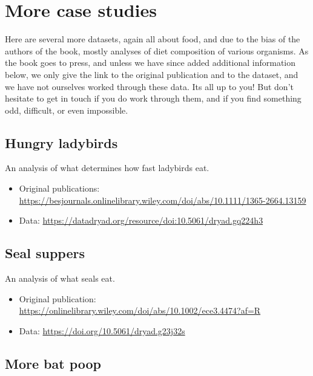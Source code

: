 \documentclass[]{book}
\providecommand{\tightlist}{%
  \setlength{\itemsep}{0pt}\setlength{\parskip}{0pt}}
\begin{document}
\hypertarget{more-case-studies}{%
\section{More case studies}\label{more-case-studies}}

Here are several more datasets, again all about food, and due to the bias of the authors of the book, mostly analyses of diet composition of various organisms. As the book goes to press, and unless we have since added additional information below, we only give the link to the original publication and to the dataset, and we have not ourselves worked through these data. Its all up to you! But don't hesitate to get in touch if you do work through them, and if you find something odd, difficult, or even impossible.

\hypertarget{hungry-ladybirds}{%
\subsection{Hungry ladybirds}\label{hungry-ladybirds}}

An analysis of what determines how fast ladybirds eat.

\begin{itemize}
\tightlist
\item
  Original publications: \url{https://besjournals.onlinelibrary.wiley.com/doi/abs/10.1111/1365-2664.13159}
\item
  Data: \url{https://datadryad.org/resource/doi:10.5061/dryad.gq224h3}
\end{itemize}

\hypertarget{seal-suppers}{%
\subsection{Seal suppers}\label{seal-suppers}}

An analysis of what seals eat.

\begin{itemize}
\tightlist
\item
  Original publication: \url{https://onlinelibrary.wiley.com/doi/abs/10.1002/ece3.4474?af=R}
\item
  Data: \url{https://doi.org/10.5061/dryad.g23j32s}
\end{itemize}

\hypertarget{more-bat-poop}{%
\subsection{More bat poop}\label{more-bat-poop}}
\end{document}
